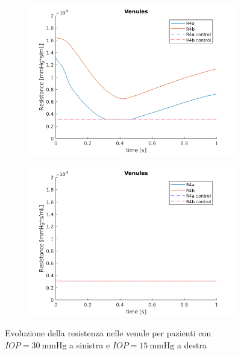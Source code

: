 \documentclass{article}
\begin{document}
\begin{figure}[h]
\begin{subfigure}{.5\textwidth}
  \centering
  \includegraphics[width=1.0\linewidth]{Pictures/IOP30_part1/venules_30.png}
\end{subfigure}
\begin{subfigure}{.5\textwidth}
  \centering
  \includegraphics[width=1.0\linewidth]{Pictures/IOP15_part1/venules_15.png}
\end{subfigure}
\caption{Evoluzione della resistenza nelle venule per pazienti con $IOP = \SI{30}{\mmHg}$ a sinistra e $IOP = \SI{15}{\mmHg}$ a destra}
\label{venule1530}
\end{figure}
\end{document}
